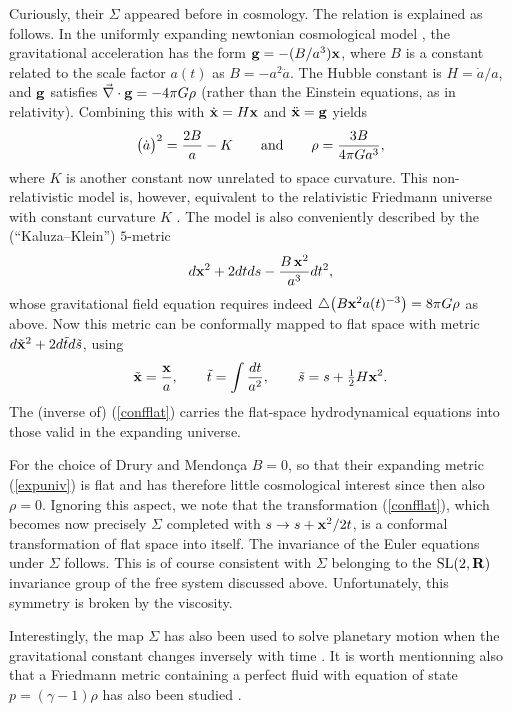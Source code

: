 \documentclass[11pt,a4paper]{article}
\def\IR{{\bf R}}
\def\smallover#1/#2{\hbox{$\textstyle{#1\over#2}$}} %
\begin{document}
Curiously, their $\Sigma$
appeared before in cosmology.
The relation is explained as follows.
 In the uniformly expanding newtonian cosmological model \cite{SOU},
the gravitational acceleration has the form
${\bf g}=-(B/a^3){\bf x}$,
where $B$ is a constant related to the scale factor $a(t)$
as $B=-a^2\ddot{a}$.  The Hubble constant is $H=\dot{a}/a$,
and ${\bf g}$ satisfies
$\vec\nabla\cdot{\bf g}=-4\pi G\rho$
(rather than the Einstein equations, as in relativity).
Combining this with $\dot{\bf x}=H{\bf x}$ and $\ddot{\bf x}={\bf g}$ yields
\begin{equation}
    \big(\dot{a}\big)^2=\frac{2B}{a}-K
    \qquad\hbox{and}\qquad
    \rho=\frac{3B}{4\pi Ga^{3}},
\end{equation}
where $K$ is another constant now unrelated to space curvature.
This non-relativistic model is, however,
equivalent to the relativistic
Friedmann universe with constant curvature $K$ \cite{HE}.
The model is also conveniently described \cite{DGH}
by the (``Kaluza--Klein'') $5$-metric
\begin{equation}
    d{\bf x}^2+2dtds-\frac{B\,{\bf x}^{2}}{a^3}dt^2,
    \label{expuniv}
\end{equation}
whose gravitational field equation requires indeed
$\bigtriangleup \big(B{\bf x}^2a(t)^{-3}\big)=8\pi G\rho$ as above.
Now this metric can be conformally mapped to flat space
with metric $d{\tilde{\bf x}}^2+2d\tilde{t}d\tilde{s}$, using
\begin{equation}
    \tilde{\bf x}=\frac{{\bf x}}{a},
    \qquad
    \tilde{t}=\int \frac{dt}{a^{2}},
    \qquad
    \tilde{s}=s+\smallover1/2H{\bf x}^2.
    \label{confflat}
\end{equation}
The (inverse of) (\ref{confflat}) carries the flat-space
hydrodynamical equations
into those valid in the expanding universe.

For the choice of Drury and Mendon\c ca   $B=0$, so that
their expanding metric (\ref{expuniv}) is flat
and has therefore little cosmological interest since then also $\rho=0$.
Ignoring this aspect, we note that the transformation (\ref{confflat}),
which becomes now precisely $\Sigma$ completed with
$s\to s+{\bf x}^2/2t$,  is a conformal transformation of flat space into
itself. The invariance of the Euler equations
under $\Sigma$ follows. This is of course consistent with $\Sigma$
belonging to the ${\rm SL}(2,\IR)$ invariance group of the free system
discussed above. Unfortunately, this symmetry is broken by the viscosity.

Interestingly, the  map $\Sigma$ has also been used
to solve planetary motion when the gravitational constant changes
inversely with time \cite{VIN, DGH}.
It is worth mentionning also that a Friedmann metric
containing a perfect fluid with equation of state
$p=(\gamma-1)\rho$ has also been studied \cite{BARROW}.
\end{document}
